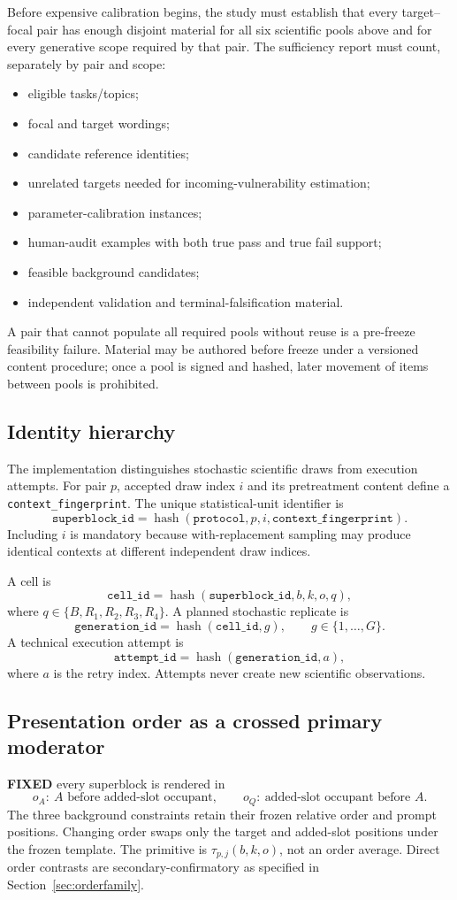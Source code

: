 \documentclass[11pt,a4paper]{article}
\newcommand{\FIXED}{\textbf{FIXED}}
\begin{document}
Before expensive calibration begins, the study must establish that every target--focal pair has enough disjoint material for all six scientific pools above and for every generative scope required by that pair. The sufficiency report must count, separately by pair and scope:
\begin{itemize}
\item eligible tasks/topics;
\item focal and target wordings;
\item candidate reference identities;
\item unrelated targets needed for incoming-vulnerability estimation;
\item parameter-calibration instances;
\item human-audit examples with both true pass and true fail support;
\item feasible background candidates;
\item independent validation and terminal-falsification material.
\end{itemize}
A pair that cannot populate all required pools without reuse is a pre-freeze feasibility failure. Material may be authored before freeze under a versioned content procedure; once a pool is signed and hashed, later movement of items between pools is prohibited.

\subsection{Identity hierarchy}
The implementation distinguishes stochastic scientific draws from execution attempts. For pair $p$, accepted draw index $i$ and its pretreatment content define a \texttt{context\_fingerprint}. The unique statistical-unit identifier is
\[
\texttt{superblock\_id}=\operatorname{hash}(\texttt{protocol},p,i,\texttt{context\_fingerprint}).
\]
Including $i$ is mandatory because with-replacement sampling may produce identical contexts at different independent draw indices.

A cell is
\[
\texttt{cell\_id}=\operatorname{hash}(\texttt{superblock\_id},b,k,o,q),
\]
where $q\in\{B,R_1,R_2,R_3,R_4\}$. A planned stochastic replicate is
\[
\texttt{generation\_id}=\operatorname{hash}(\texttt{cell\_id},g),\qquad g\in\{1,\ldots,G\}.
\]
A technical execution attempt is
\[
\texttt{attempt\_id}=\operatorname{hash}(\texttt{generation\_id},a),
\]
where $a$ is the retry index. Attempts never create new scientific observations.

\subsection{Presentation order as a crossed primary moderator}
\FIXED{} every superblock is rendered in
\[
o_A:\ A\text{ before added-slot occupant},\qquad
o_Q:\ \text{added-slot occupant before }A.
\]
The three background constraints retain their frozen relative order and prompt positions. Changing order swaps only the target and added-slot positions under the frozen template. The primitive is $\tau_{p,j}(b,k,o)$, not an order average. Direct order contrasts are secondary-confirmatory as specified in Section~\ref{sec:orderfamily}.
\end{document}
